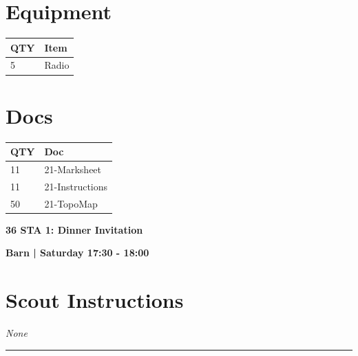\documentclass[10pt]{article}
\newcommand{\newtitle}[1]{\begin{center}{\Huge\bfseries #1 }\\ \vspace{5mm}\end{center}}
\newcommand{\newsubtitle}[1]{\begin{center}{\color{grey}\Large\bfseries #1 }\\ \vspace{5mm}\end{center}}
\begin{document}
	\begin{multicols}{2}

		\section*{\faWrench \: Equipment}

		
	\begin{center}
			\begin{tabular}{p{2cm}p{4cm}}


				\textbf{QTY} & \textbf{Item} \\\toprule
												5&Radio\\\midrule
								\end{tabular}

			\end{center}

		
		\vfill\null
		\columnbreak

			\section*{\faFile \: Docs}
		 	\begin{center}
			\begin{tabular}{p{2cm}p{4cm}}

			\textbf{QTY} & \textbf{Doc} \\\toprule
										11&21-Marksheet\\\midrule
										11&21-Instructions\\\midrule
										50&21-TopoMap\\\midrule
							\end{tabular}
			\end{center}
	

		\vfill\null

		\end{multicols}



	\vspace{1cm}


	\clearpage
		\newtitle{36 STA 1: Dinner Invitation }
	\newsubtitle{Barn | Saturday 17:30 - 18:00}
		\setcounter{section}{35}
	\section*{Scout Instructions}
		\textit{None}
	
	\vspace{0.5cm}
	\hrule
	\vspace{0.5cm}
\end{document}
